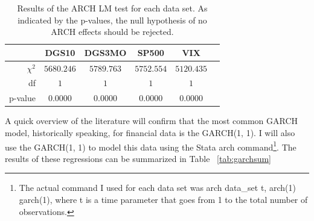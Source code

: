 \documentclass[a4paper, 11pt, twoside]{article}
\theoremstyle{definition} %
\numberwithin{equation}{section}
\begin{document}
    \begin{table}[ht!]
      \begin{center}
        \begin{tabular}{r|ccccc}
        \hline
           \rowcolor{gray!45}  & DGS10  & DGS3MO  & SP500 & VIX \\
          \hline
          \hline
          \rowcolor{gray!7} $\chi^2$ & $5680.246$ & $5789.763$ & $5752.554$ & $5120.435 $\\
          \rowcolor{gray!23} df & $1$ & $1$ & $1$ & $1$\\
          \rowcolor{gray!7} p-value & $0.0000$ & $0.0000$ & $0.0000$ & $0.0000$\\
        \bottomrule
        \end{tabular}
        \captionsetup{width=5.5in}
        \caption{\small Results of the ARCH LM test for each data set. As indicated by the p-values, the null hypothesis of no ARCH effects should be rejected.}
        \label{tab:archlm}
      \end{center}
    \end{table}

    A quick overview of the literature will confirm that the most common GARCH model, historically speaking, for financial data is the GARCH(1, 1). I will also use the GARCH(1, 1) to model this data using the Stata arch command\footnote{The actual command I used for each data set was arch data\_set t, arch(1) garch(1), where t is a time parameter that goes from 1 to the total number of observations.}. The results of these regressions can be summarized in Table ~\ref{tab:garchsum}
\end{document}
